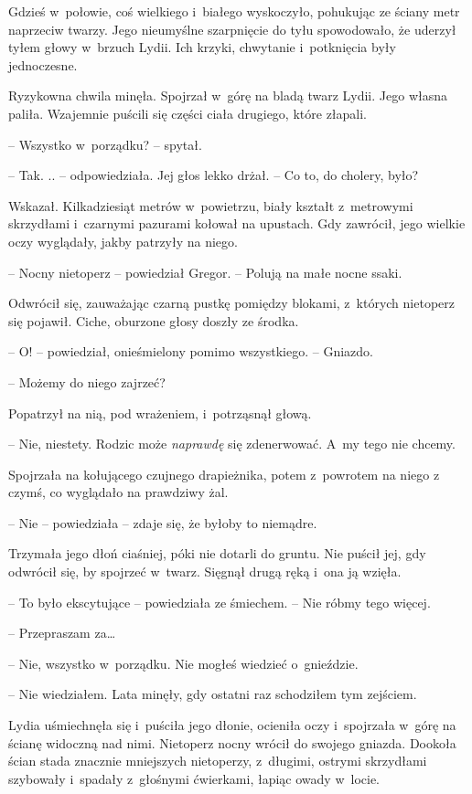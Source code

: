 \documentclass[oneside,polish,12pt,sfheadings]{mwbk}
\begin{document}
Gdzieś w~połowie, coś wielkiego i~białego wyskoczyło, pohukując ze
ściany metr naprzeciw twarzy. Jego nieumyślne szarpnięcie do tyłu
spowodowało, że uderzył tyłem głowy w~brzuch Lydii. Ich krzyki,
chwytanie i~potknięcia były jednoczesne.

Ryzykowna chwila minęła. Spojrzał w~górę na bladą twarz Lydii. Jego
własna paliła. Wzajemnie puścili się części ciała drugiego, które
złapali.

-- Wszystko w~porządku? -- spytał.

-- Tak. .. -- odpowiedziała. Jej głos lekko drżał. -- Co to, do cholery,
było?

Wskazał. Kilkadziesiąt metrów w~powietrzu, biały kształt z~metrowymi
skrzydłami i~czarnymi pazurami kołował na upustach. Gdy zawrócił, jego
wielkie oczy wyglądały, jakby patrzyły na niego.

-- Nocny nietoperz -- powiedział Gregor. -- Polują na małe nocne ssaki.

Odwrócił się, zauważając czarną pustkę pomiędzy blokami, z~których
nietoperz się pojawił. Ciche, oburzone głosy doszły ze środka.

-- O! -- powiedział, onieśmielony pomimo wszystkiego. -- Gniazdo.

-- Możemy do niego zajrzeć?

Popatrzył na nią, pod wrażeniem, i~potrząsnął głową.

-- Nie, niestety. Rodzic może \emph{naprawdę} się zdenerwować. A~my tego
nie chcemy.

Spojrzała na kołującego czujnego drapieżnika, potem z~powrotem na niego
z czymś, co wyglądało na prawdziwy żal. 

-- Nie -- powiedziała -- zdaje się,
że byłoby to niemądre.

Trzymała jego dłoń ciaśniej, póki nie dotarli do gruntu. Nie puścił jej,
gdy odwrócił się, by spojrzeć w~twarz. Sięgnął drugą ręką i~ona ją
wzięła.

-- To było ekscytujące -- powiedziała ze śmiechem. -- Nie róbmy tego
więcej.

-- Przepraszam za\ldots

-- Nie, wszystko w~porządku. Nie mogłeś wiedzieć o~gnieździe.

-- Nie wiedziałem. Lata minęły, gdy ostatni raz schodziłem tym zejściem.

Lydia uśmiechnęła się i~puściła jego dłonie, ocieniła oczy i~spojrzała w~górę na ścianę widoczną nad nimi. Nietoperz nocny wrócił do swojego
gniazda. Dookoła ścian stada znacznie mniejszych nietoperzy, z~długimi,
ostrymi skrzydłami szybowały i~spadały z~głośnymi ćwierkami, łapiąc
owady w~locie.
\end{document}
